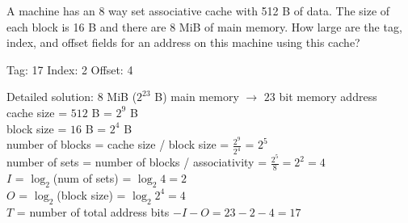 \begin{blocksection}
\question
A machine has an 8 way set associative cache with 512 B of data. The size of each block is 16 B and there are 8 MiB of main memory. How large are the tag, index, and offset fields for an address on this machine using this cache?

\begin{solution}[0.7in]
Tag: ​17 Index: ​2 Offset: ​4

Detailed solution:
$8$ MiB ($2^23$ B) main memory $\rightarrow$ $23$ bit memory address\\
cache size = $512$ B = $2^9$ B\\
block size = $16$ B = $2^4$ B\\
number of blocks = cache size / block size = $\frac{2^9}{2^4}$ = $2^5$\\
number of sets = number of blocks / associativity = $\frac{2^5}{8} = 2^2 = 4$\\
$I$ = $\log_2$(num of sets) = $\log_2 4 = 2$\\
$O$ = $\log_2$(block size) = $\log_2 2^4 = 4$\\
$T$ = number of total address bits $- I - O = 23 - 2 - 4 = 17$\\
\end{solution}

\end{blocksection}